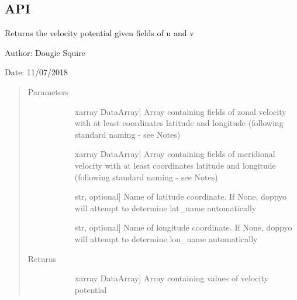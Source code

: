 \documentclass[letterpaper,10pt,english]{sphinxmanual}
\begin{document}
\subsection{API}
\label{\detokenize{diagnostic_doc:api}}

\begin{fulllineitems}
\label{\detokenize{diagnostic_doc:diagnostic.velocity_potential}}
Returns the velocity potential given fields of u and v

\begin{DUlineblock}{0em}
\item[] Author: Dougie Squire
\item[] Date: 11/07/2018
\end{DUlineblock}
\begin{quote}\begin{description}
\item[{Parameters}] \leavevmode\begin{description}
\item[{}] \leavevmode{[}xarray DataArray{]}
Array containing fields of zonal velocity with at least coordinates latitude and longitude                     (following standard naming - see Notes)

\item[{}] \leavevmode{[}xarray DataArray{]}
Array containing fields of meridional velocity with at least coordinates latitude and                     longitude (following standard naming - see Notes)

\item[{}] \leavevmode{[}str, optional{]}
Name of latitude coordinate. If None, doppyo will attempt to determine lat\_name                     automatically

\item[{}] \leavevmode{[}str, optional{]}
Name of longitude coordinate. If None, doppyo will attempt to determine lon\_name                     automatically

\end{description}

\item[{Returns}] \leavevmode\begin{description}
\item[{}] \leavevmode{[}xarray DataArray{]}
Array containing values of velocity potential


\end{description}
\end{description}
\end{quote}
\end{fulllineitems}
\end{document}
